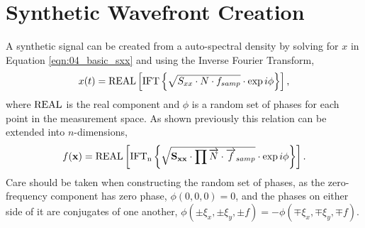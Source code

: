 \section{Synthetic Wavefront Creation}
A synthetic signal can be created from a auto-spectral density by solving for $x$ in Equation \ref{eqn:04_basic_sxx} and using the Inverse Fourier Transform,
\begin{equation}
 x(t) = \operatorname{REAL}\left[\operatorname{IFT}\left\{\sqrt{S_{xx}\cdot N\cdot f_{samp}}\cdot\exp{i\phi}\right\}\right] \textrm{,}
 \label{eqn:05_ifft}
\end{equation}
where $\operatorname{REAL}$ is the real component and $\phi$ is a random set of phases for each point in the measurement space.
As shown previously this relation can be extended into $n$-dimensions,
\begin{equation}
 f(\mathbf{x}) = \operatorname{REAL}\left[\operatorname{IFT_n}\left\{\sqrt{\mathbf{S_{xx}}\cdot\prod{\overrightarrow{N}\cdot \overrightarrow{f}_{samp}}}\cdot\exp{i\mathbf{\phi}}\right\}\right] \textrm{.}
 \label{eqn:05_ifftn}
\end{equation}
Care should be taken when constructing the random set of phases, as the zero-frequency component has zero phase, $\phi(0,0,0) = 0$, and the phases on either side of it are conjugates of one another, $\phi(\pm\xi_x,\pm\xi_y,\pm f)=-\phi(\mp\xi_x,\mp\xi_y,\mp f)$.

